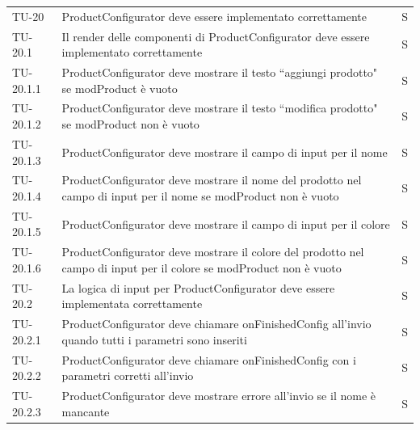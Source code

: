 \begin{xltabular}{0.9\textwidth}{X | p{0.6\textwidth} | p{0.1\textwidth} }
    TU-20 & ProductConfigurator deve essere implementato correttamente & S\\
    TU-20.1 & Il render delle componenti di ProductConfigurator deve essere implementato correttamente & S\\
    TU-20.1.1 & ProductConfigurator deve mostrare il testo ``aggiungi prodotto" se modProduct è vuoto & S\\
    TU-20.1.2 & ProductConfigurator deve mostrare il testo ``modifica prodotto" se modProduct non è vuoto & S\\
    TU-20.1.3 & ProductConfigurator deve mostrare il campo di input per il nome & S\\
    TU-20.1.4 & ProductConfigurator deve mostrare il nome del prodotto nel campo di input per il nome se modProduct non è vuoto & S\\
    TU-20.1.5 & ProductConfigurator deve mostrare il campo di input per il colore & S\\
    TU-20.1.6 & ProductConfigurator deve mostrare il colore del prodotto nel campo di input per il colore se modProduct non è vuoto & S\\
    TU-20.2 & La logica di input per ProductConfigurator deve essere implementata correttamente & S\\
    TU-20.2.1 & ProductConfigurator deve chiamare onFinishedConfig all'invio quando tutti i parametri sono inseriti & S\\
    TU-20.2.2 & ProductConfigurator deve chiamare onFinishedConfig con i parametri corretti all'invio & S\\
    TU-20.2.3 & ProductConfigurator deve mostrare errore all'invio se il nome è mancante & S\\
    

\end{xltabular}
